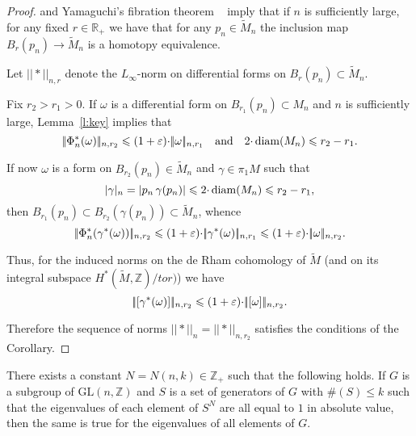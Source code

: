 \documentclass{amsart}
\begin{document}
\begin{proof} \cite[theorem 0.1]{FY} and
Yamaguchi's fibration theorem ~\cite{Yam} imply
that if $n$ is sufficiently large,
for any fixed $r\in \mathbb{R}_+$
we have that for any $p_n\in \tilde M_n$
the inclusion map $B_r(p_n)\to \tilde M_n$ is a homotopy equivalence.

Let $|\!|*|\!|_{n,r}$ denote the $L_\infty$-norm
on differential forms on $B_{r}(p_n)\subset \tilde M_n$.


Fix $r_2>r_1>0$.
If $\omega$ is a differential form on  $B_{r_1}(p_n)\subset M_n$
and $n$ is sufficiently large,  Lemma~\ref{l:key} implies that
$$|\!|\Phi^*_n(\omega)|\!|_{n,r_2}
\leqslant
(1+\varepsilon){\cdot}|\!|\omega |\!|_{n,r_1}
\quad\text{and}\quad2{\cdot} \operatorname{\rm diam}(M_n)\leqslant r_2-r_1.$$

If now $\omega$ is a form on
$B_{r_2}(p_n)\in \tilde M_n$ and
$\gamma\in \pi_1M$
such that
$$|\gamma|_n=|p_n\,\gamma(p_n)|\leqslant 2{\cdot} \operatorname{\rm diam}(M_n)\leqslant  r_2-r_1,$$
then $B_{r_1}(p_n)\subset B_{r_2}(\gamma(p_n))\subset \tilde M_n$, whence
$$|\!|\Phi^*_n(\gamma^*(\omega))|\!|_{n,r_2}\leqslant
(1+\varepsilon){\cdot}|\!|\gamma^*(\omega)|\!|_{n,r_1}\leqslant
(1+\varepsilon){\cdot}|\!|\omega|\!|_{n,r_2}.$$

Thus, for the induced norms on the de Rham cohomology
of $\tilde M$ (and on its integral subspace $H^*(\tilde M,\mathbb{Z})/tor)$)  we have
$$|\!|[\gamma^*(\omega)]|\!|_{n,r_2}\leqslant
(1+\varepsilon){\cdot}|\!|[\omega]|\!|_{n,r_2}.$$

Therefore the sequence of norms $|\!|*|\!|_n=|\!|*|\!|_{n,r_2}$ satisfies the conditions of the Corollary.
\end{proof}


\begin{lem}\label{lem:eigen}
There exists a constant $N=N(n,k)\in \mathbb{Z}_+$ such that the following holds.
If $G$ is a subgroup of $\mathrm{GL}(n,\mathbb{Z})$ and $S$ is a set of generators of $G$
with $\#(S)\le k$ such that the eigenvalues of each element of
$S^N$ are all equal to $1$ in absolute value,
then the same is true for the eigenvalues of all
elements of $G$.
\end{lem}
\end{document}
